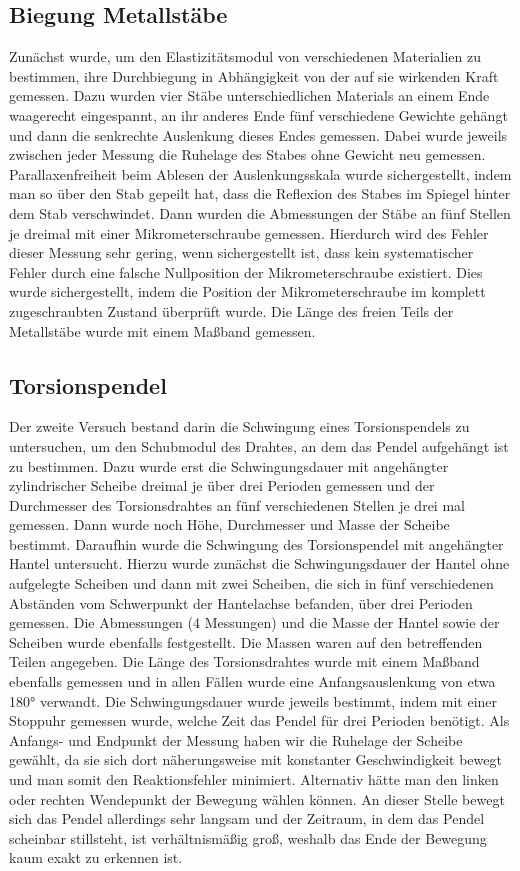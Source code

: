 \documentclass[
	a4paper,
	12pt,
	pagesize,
	ngerman
]{scrartcl}
\begin{document}
	\subsection{Biegung Metallstäbe} %
	Zunächst wurde, um den Elastizitätsmodul von verschiedenen Materialien zu bestimmen, ihre Durchbiegung in Abhängigkeit von der auf sie wirkenden Kraft gemessen. Dazu wurden vier Stäbe unterschiedlichen Materials an einem Ende waagerecht eingespannt, an ihr anderes Ende fünf verschiedene Gewichte gehängt und dann die senkrechte Auslenkung dieses Endes gemessen.
	Dabei wurde jeweils zwischen jeder Messung die Ruhelage des Stabes ohne Gewicht neu gemessen. Parallaxenfreiheit beim Ablesen der Auslenkungsskala wurde sichergestellt, indem man so über den Stab gepeilt hat, dass die Reflexion des Stabes im Spiegel hinter dem Stab verschwindet. %
	Dann wurden die Abmessungen der Stäbe an fünf Stellen je dreimal mit einer Mikrometerschraube  gemessen. Hierdurch wird des Fehler dieser Messung sehr gering, wenn sichergestellt ist, dass kein systematischer Fehler durch eine falsche Nullposition der Mikrometerschraube existiert. Dies wurde sichergestellt, indem die Position der Mikrometerschraube im komplett zugeschraubten Zustand überprüft wurde. Die Länge des freien Teils der Metallstäbe wurde mit einem Maßband gemessen.
	
	\subsection{Torsionspendel}
	Der zweite Versuch bestand darin die Schwingung eines Torsionspendels zu untersuchen, um den Schubmodul des Drahtes, an dem das Pendel aufgehängt ist zu bestimmen.
	Dazu wurde erst die Schwingungsdauer mit angehängter zylindrischer Scheibe dreimal je über drei Perioden gemessen und der Durchmesser des Torsionsdrahtes an fünf verschiedenen Stellen je drei mal gemessen. Dann wurde noch Höhe, Durchmesser und Masse der Scheibe bestimmt.
	Daraufhin wurde die Schwingung des Torsionspendel mit angehängter Hantel untersucht. Hierzu wurde zunächst die Schwingungsdauer der Hantel ohne aufgelegte Scheiben und dann mit zwei Scheiben, die sich in fünf verschiedenen Abständen vom Schwerpunkt der Hantelachse befanden, über drei Perioden gemessen. Die Abmessungen (4 Messungen) und die Masse der Hantel sowie der Scheiben wurde ebenfalls festgestellt. Die Massen waren auf den betreffenden Teilen angegeben.
	Die Länge des Torsionsdrahtes wurde mit einem Maßband ebenfalls gemessen und in allen Fällen wurde eine Anfangsauslenkung von etwa 180° verwandt. Die Schwingungsdauer wurde jeweils bestimmt, indem mit einer Stoppuhr gemessen wurde, welche Zeit das Pendel für drei Perioden benötigt. Als Anfangs- und Endpunkt der Messung haben wir die Ruhelage der Scheibe gewählt, da sie sich dort näherungsweise mit konstanter Geschwindigkeit bewegt und man somit den Reaktionsfehler minimiert.
	Alternativ hätte man den linken oder rechten Wendepunkt der Bewegung wählen können. An dieser Stelle bewegt sich das Pendel allerdings sehr langsam und der Zeitraum, in dem das Pendel scheinbar stillsteht, ist verhältnismäßig groß, weshalb das Ende der Bewegung kaum exakt zu erkennen ist.
	
\end{document}
